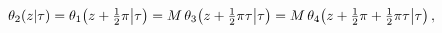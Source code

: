 \[\mathop{\theta_{2}\/}\nolimits\!\left(z\middle|\tau\right)=\mathop{\theta_{1}%
\/}\nolimits\!\left(z+\tfrac{1}{2}\pi\middle|\tau\right)=M\mathop{\theta_{3}\/%
}\nolimits\!\left(z+\tfrac{1}{2}\pi\tau\middle|\tau\right)=M\mathop{\theta_{4}%
\/}\nolimits\!\left(z+\tfrac{1}{2}\pi+\tfrac{1}{2}\pi\tau\middle|\tau\right),\]